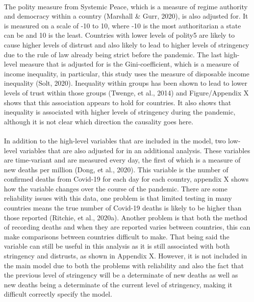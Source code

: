 \documentclass[
  11pt,
]{article}
\begin{document}
~\\
The polity measure from Systemic Peace, which is a measure of regime authority and democracy within a country (Marshall \& Gurr, 2020), is also adjusted for. It is measured on a scale of -10 to 10, where -10 is the most authoritarian a state can be and 10 is the least. Countries with lower levels of polity5 are likely to cause higher levels of distrust and also likely to lead to higher levels of stringency due to the rule of law already being strict before the pandemic. The last high-level measure that is adjusted for is the Gini-coefficient, which is a measure of income inequality, in particular, this study uses the measure of disposable income inequality (Solt, 2020). Inequality within groups has been shown to lead to lower levels of trust within those groups (Twenge, et al., 2014) and Figure/Appendix X shows that this association appears to hold for countries. It also shows that inequality is associated with higher levels of stringency during the pandemic, although it is not clear which direction the causality goes here.\\
~\\
In addition to the high-level variables that are included in the model, two low-level variables that are also adjusted for in an additional analysis. These variables are time-variant and are measured every day, the first of which is a measure of new deaths per million (Dong, et al., 2020). This variable is the number of confirmed deaths from Covid-19 for each day for each country, appendix X shows how the variable changes over the course of the pandemic. There are some reliability issues with this data, one problem is that limited testing in many countries means the true number of Covid-19 deaths is likely to be higher than those reported (Ritchie, et al., 2020a). Another problem is that both the method of recording deaths and when they are reported varies between countries, this can make comparisons between countries difficult to make. That being said the variable can still be useful in this analysis as it is still associated with both stringency and distrusts, as shown in Appendix X. However, it is not included in the main model due to both the problems with reliability and also the fact that the previous level of stringency will be a determinate of new deaths as well as new deaths being a determinate of the current level of stringency, making it difficult correctly specify the model.\\
~\\
\end{document}
